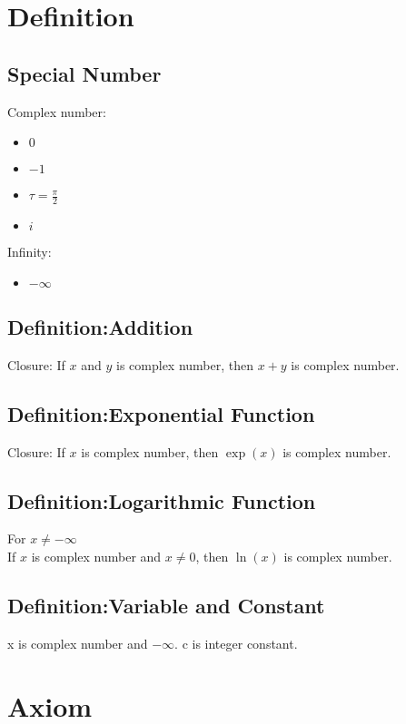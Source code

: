 \documentclass[12pt,a4paper]{report}
\begin{document}
\chapter{Definition}
\section{Special Number}
Complex number:
\begin{itemize}
\item $0$
\item $-1$
\item $\tau = \frac{\pi}{2}$
\item $i$
\end{itemize}
Infinity:
\begin{itemize}
\item $-\infty$
\end{itemize}

\section{Definition:Addition}
\label{Definition:Addition}
Closure: If $x$ and $y$ is complex number, then $x+y$ is complex number.

\section{Definition:Exponential Function}
\label{Definition:Exponential_Function}
Closure: If $x$ is complex number, then $\exp(x)$ is complex number. \\

\section{Definition:Logarithmic Function}
\label{Definition:Logarithmic_Function}
For $x \neq -\infty$ \\
If $x$ is complex number and $x \neq 0$, then $\ln(x)$ is complex number. \\

\section{Definition:Variable and Constant}
x is complex number and $-\infty$. c is integer constant.

\chapter{Axiom}
\end{document}
